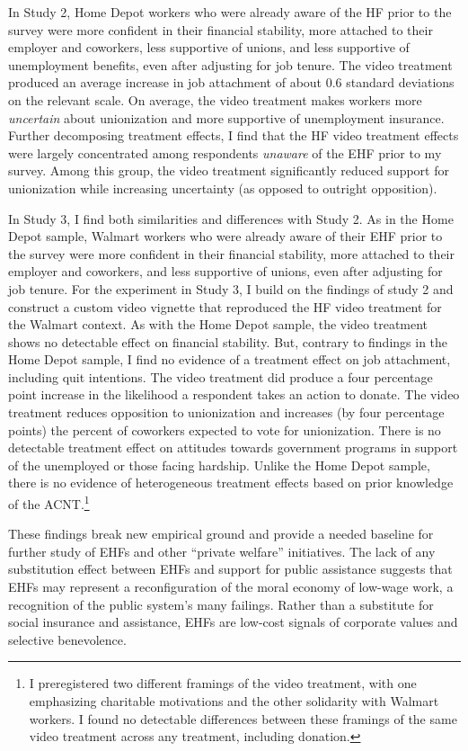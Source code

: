 \documentclass[
  11pt,
  oneside]{article}
\begin{document}
In Study 2, Home Depot workers who were already aware of the HF prior to the survey were more confident in their financial stability, more attached to their employer and coworkers, less supportive of unions, and less supportive of unemployment benefits, even after adjusting for job tenure. The video treatment produced an average increase in job attachment of about 0.6 standard deviations on the relevant scale. On average, the video treatment makes workers more \emph{uncertain} about unionization and more supportive of unemployment insurance. Further decomposing treatment effects, I find that the HF video treatment effects were largely concentrated among respondents \emph{unaware} of the EHF prior to my survey. Among this group, the video treatment significantly reduced support for unionization while increasing uncertainty (as opposed to outright opposition).

In Study 3, I find both similarities and differences with Study 2. As in the Home Depot sample, Walmart workers who were already aware of their EHF prior to the survey were more confident in their financial stability, more attached to their employer and coworkers, and less supportive of unions, even after adjusting for job tenure. For the experiment in Study 3, I build on the findings of study 2 and construct a custom video vignette that reproduced the HF video treatment for the Walmart context. As with the Home Depot sample, the video treatment shows no detectable effect on financial stability. But, contrary to findings in the Home Depot sample, I find no evidence of a treatment effect on job attachment, including quit intentions. The video treatment did produce a four percentage point increase in the likelihood a respondent takes an action to donate. The video treatment reduces opposition to unionization and increases (by four percentage points) the percent of coworkers expected to vote for unionization. There is no detectable treatment effect on attitudes towards government programs in support of the unemployed or those facing hardship. Unlike the Home Depot sample, there is no evidence of heterogeneous treatment effects based on prior knowledge of the ACNT.\footnote{I preregistered two different framings of the video treatment, with one emphasizing charitable motivations and the other solidarity with Walmart workers. I found no detectable differences between these framings of the same video treatment across any treatment, including donation.}

These findings break new empirical ground and provide a needed baseline for further study of EHFs and other ``private welfare'' initiatives. The lack of any substitution effect between EHFs and support for public assistance suggests that EHFs may represent a reconfiguration of the moral economy of low-wage work, a recognition of the public system's many failings. Rather than a substitute for social insurance and assistance, EHFs are low-cost signals of corporate values and selective benevolence.
\end{document}

